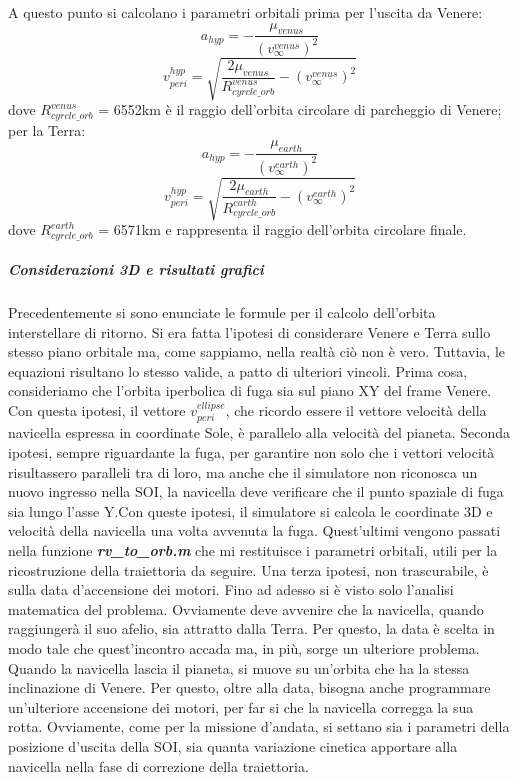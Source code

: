 \documentclass[a4paper]{article}
\begin{document}
A questo punto si calcolano i parametri orbitali prima per l'uscita da Venere:
\[
\textit{a}_{hyp} = -\frac{\mu_{venus}}{(\textit{v}_{\infty}^{venus})^{2}}
\]
\[
\textit{v}_{peri}^{hyp} = \sqrt{\frac{2\mu_{venus}}{R_{cyrcle\_orb}^{venus}}-(\textit{v}_{\infty}^{venus})^{2}}
\]
dove $R_{cyrcle\_orb}^{venus}$ = 6552km è il raggio dell'orbita circolare di parcheggio di Venere; per la Terra:
\[
\textit{a}_{hyp} = -\frac{\mu_{earth}}{(\textit{v}_{\infty}^{earth})^{2}}
\]
\[
\textit{v}_{peri}^{hyp} = \sqrt{\frac{2\mu_{earth}}{R_{cyrcle\_orb}^{earth}}-(\textit{v}_{\infty}^{earth})^{2}}
\]
dove $R_{cyrcle\_orb}^{earth}$ = 6571km e rappresenta il raggio dell'orbita circolare finale.

\subparagraph{Considerazioni 3D e risultati grafici\newline}
Precedentemente si sono enunciate le formule per il calcolo dell'orbita interstellare di ritorno. Si era fatta l'ipotesi di considerare Venere e Terra sullo stesso piano orbitale ma, come sappiamo, nella realtà ciò non è vero. Tuttavia, le equazioni risultano lo stesso valide, a patto di ulteriori vincoli. Prima cosa, consideriamo che l'orbita iperbolica di fuga sia sul piano XY del frame Venere. Con questa ipotesi, il vettore $\textit{v}_{peri}^{ellipse}$, che ricordo essere il vettore velocità della navicella espressa in coordinate Sole, è parallelo alla velocità del pianeta. \newline Seconda ipotesi, sempre riguardante la fuga, per garantire non solo che i vettori velocità risultassero paralleli tra di loro, ma anche che il simulatore non riconosca un nuovo ingresso nella SOI, la navicella deve verificare che il punto spaziale di fuga sia lungo l'asse Y.\newline Con queste ipotesi, il simulatore si calcola le coordinate 3D e velocità della navicella una volta avvenuta la fuga. Quest'ultimi vengono passati nella funzione \textit{\textbf{rv\_to\_orb.m}} che mi restituisce i parametri orbitali, utili per la ricostruzione della traiettoria da seguire. \newline Una terza ipotesi, non trascurabile, è sulla data d'accensione dei motori. Fino ad adesso si è visto solo l'analisi matematica del problema. Ovviamente deve avvenire che la navicella, quando raggiungerà il suo afelio, sia attratto dalla Terra. Per questo, la data è scelta in modo tale che quest'incontro accada ma, in più, sorge un ulteriore problema. Quando la navicella lascia il pianeta, si muove su un'orbita che ha la stessa inclinazione di Venere. Per questo, oltre alla data, bisogna anche programmare un'ulteriore accensione dei motori, per far si che la navicella corregga la sua rotta. \newline Ovviamente, come per la missione d'andata, si settano sia i parametri della posizione d'uscita della SOI, sia quanta variazione cinetica apportare alla navicella nella fase di correzione della traiettoria. \newline
\end{document}
